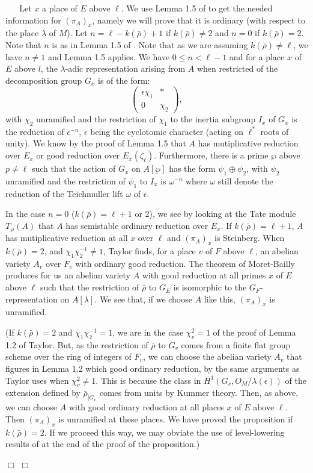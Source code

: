 \documentclass[12pt]{article}
\newenvironment{proof}{\smallskip\noindent{\bf Proof.}\
}{$\Box$\smallskip\goodbreak}
\def\rhob{ {\bar {\rho} } }
\begin{document}
\begin{proof}
\begin{proof}
Let $x$ a place of $E$ above $\ell$. We use Lemma 1.5
of \cite{[T02]} to get the needed information for  $(\pi _A )_x$,
namely we will prove that it is ordinary (with respect to
the place $\lambda$ of $M$).
Let $n=\ell-k(\rhob )+1$ if $k(\rhob)\not=2$ and
$n=0$ if $k(\rhob)=2$. Note that $n$ is as in Lemma 1.5 of
\cite{[T02]}.
Note that as we are assuming $k(\rhob)\not= \ell$,
we have $n\not=1$ and Lemma 1.5  applies.
We have $0\leq n< \ell-1$ and for a place $x$ of
$E$ above $l$, the $\lambda$-adic representation arising from $A$
when restricted  of the decomposition group
$G_x$ is of the form:
$$\left( \begin{array}{cc}
    \epsilon \chi _1 & *  \\
    0 & \chi_2
\end{array} \right),$$
with $\chi_2$ unramified and the restriction of $\chi_1$
to the inertia subgroup $I_x$ of $G_x$ is the reduction of
$\epsilon^{-n}$, $\epsilon$ being the cyclotomic character
(acting on $\ell^*$ roots of unity). We know by the proof
of Lemma 1.5 that $A$ has mutiplicative reduction over $E_x$
or good reduction over $E_x (\zeta_{\ell })$. Furthermore, there
is a prime $\wp$ above $p\not=\ell$ such that the action
of $G_x$ on $A[\wp ]$ has the form $\psi _1 \oplus \psi _2$,
with $\psi_2$ unramified and the restriction of $\psi _1$
to $I_x$ is $\omega^{-n}$ where $\omega$ still denote
the reduction of the Teichmuller lift $\omega$ of $\epsilon$.


In the case $n=0$ ($k(\rhob )=\ell +1$ or 2),
we see by looking at the Tate module $T_{\wp} (A)$
that $A$ has semistable ordinary reduction over $E_x$.
If $k(\rhob )=\ell +1$, $A$ has mutiplicative reduction
at all $x$ over $\ell$
and $(\pi_{A})_{x}$ is Steinberg.
When  $k(\rhob )=2$, and $\chi_{1}\chi_{2}^{-1}\not= 1$,
Taylor finds, for a place $v$  of $F$ above $\ell$,
an abelian variety $A_{v}$ over $F_{v}$ with ordinary
good reduction.
The theorem of Moret-Bailly  \cite{Moret}
produces for us
an abelian variety $A$ with good reduction at all primes $x$
of $E$ above $\ell$ such that the
restriction of $\rhob$ to $G_E$ is  isomorphic to the $G_F$-
representation on  $A[\lambda]$. We see that, if we choose
$A$ like this, $(\pi_{A})_{x}$ is unramified.


(If $k(\rhob )=2$ and $\chi_{1}\chi_{2}^{-1}= 1$, we are in the
case $\chi_{v}^2 =1$ of the proof of Lemma 1.2 of Taylor. But, as the
restriction of $\rhob$ to $G_{v}$ comes from
a finite flat group scheme over the ring of integers of $F_{v}$,
we can choose the abelian variety
$A_{v}$ that figures in Lemma 1.2 which good ordinary reduction,
by the same arguments as Taylor uses when
$\chi_{v}^2 \not=1$. This is because the class in
$H^1 (G_{v}, O_{M}/\lambda (\epsilon ))$
of the extension defined by $\rhob _{\mid G_{v}}$ comes
from units by Kummer theory. Then, as above, we can
choose $A$ with good ordinary reduction at all places $x$ of
$E$ above $\ell$. Then $(\pi _{A})_{x}$ is unramified at these places.
We have proved the proposition if $k(\rhob )=2$.
If we proceed this way, we  may obviate the use of level-lowering results of
\cite{Jarvis} at the end of the proof of the proposition.)


\end{proof}
\end{proof}
\end{document}
